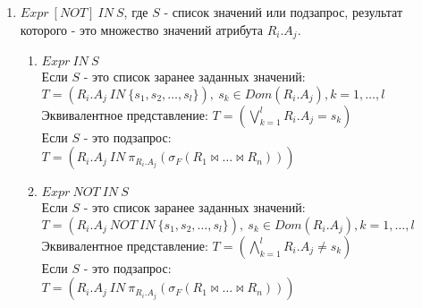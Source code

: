 \documentclass[10pt,a4paper]{article}
\def \n #1{\mathit{#1}}
\begin{document}
\begin{enumerate}
\item \label{itm:IN_S} $\n{Expr}\ \n{[NOT]}\ \n{IN}\ S$, где $S$ - список значений или подзапрос,
результат которого - это множество значений атрибута $R_i.A_j$.
\begin{enumerate}[label=\Roman*]
  \item $\n{Expr}\ \n{IN}\ S$\\
  Если $S$ - это список заранее заданных значений:\\
  $T = (\n{R_i.A_j}\ \n{IN}\ \{s_1, s_2, \dots, s_l \}),\ s_k \in Dom(R_i.A_j), k = 1, \dots, l$\\
  Эквивалентное представление: $T = (\bigvee\limits_{k=1}^{l} \n{R_i.A_j} = s_k)$\\
  Если $S$ - это подзапрос:\\
  $T = (\n{R_i.A_j}\ \n{IN}\ \pi_{R_i.A_j} (\sigma_F (R_1 \Join \dots \Join R_n)))$\\
  \item $\n{Expr}\ \n{NOT}\ \n{IN}\ S$\\
  Если $S$ - это список заранее заданных значений:\\
  $T = (\n{R_i.A_j}\ \n{NOT}\ \n{IN}\ \{s_1, s_2, \dots, s_l \}),\ s_k \in Dom(R_i.A_j), k = 1,
  \dots, l$\\
  Эквивалентное представление: $T = (\bigwedge\limits_{k=1}^{l} \n{R_i.A_j} \ne s_k)$\\
  Если $S$ - это подзапрос:\\
  $T = (\n{R_i.A_j}\ \n{IN}\ \pi_{R_i.A_j} (\sigma_F (R_1 \Join \dots \Join R_n)))$\\
\end{enumerate}



\end{enumerate}
\end{document}
